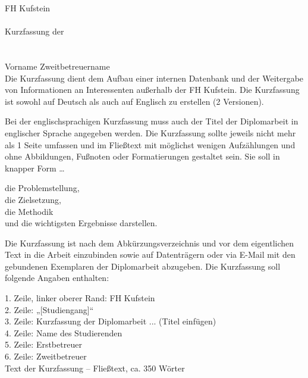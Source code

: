 \begingroup
\onehalfspacing




FH Kufstein \\
\getStudiengang \\
Kurzfassung der \getThesis\xspace \getTitel  \\
\getAutor \\
\getBetreuer \\
Vorname Zweitbetreuername \\


Die Kurzfassung dient dem Aufbau einer internen Datenbank und der Weitergabe
von Informationen an Interessenten außerhalb der FH Kufstein.
Die Kurzfassung ist sowohl auf Deutsch als auch auf Englisch zu erstellen (2 Versionen).

Bei der englischsprachigen Kurzfassung muss auch der Titel der Diplomarbeit
in englischer Sprache angegeben werden. Die Kurzfassung sollte jeweils nicht mehr
als 1 Seite umfassen und im Fließtext mit möglichst wenigen Aufzählungen und ohne
Abbildungen, Fußnoten oder Formatierungen gestaltet sein. Sie soll in knapper Form \ldots

die Problemstellung, \\
die Zielsetzung, \\
die Methodik \\
und die wichtigsten Ergebnisse darstellen. 

Die Kurzfassung ist nach dem Abkürzungsverzeichnis und vor dem
eigentlichen Text in die Arbeit einzubinden sowie auf Datenträgern oder via E-Mail
mit den gebundenen Exemplaren der Diplomarbeit abzugeben. Die Kurzfassung soll
folgende Angaben enthalten:

1. Zeile, linker oberer Rand: FH Kufstein \\
2. Zeile: „[Studiengang]“ \\
3. Zeile: Kurzfassung der Diplomarbeit ... (Titel einfügen) \\
4. Zeile: Name des Studierenden \\
5. Zeile: Erstbetreuer \\ 
6. Zeile: Zweitbetreuer \\

Text der Kurzfassung – Fließtext, ca. 350 Wörter









